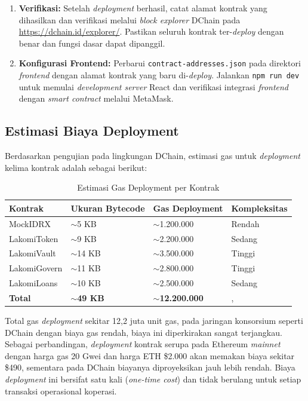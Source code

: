 \begin{enumerate}
	\item \textbf{Verifikasi:} Setelah \textit{deployment} berhasil, catat alamat kontrak yang dihasilkan dan verifikasi melalui \textit{block explorer} DChain pada \url{https://dchain.id/explorer/}. Pastikan seluruh kontrak ter-\textit{deploy} dengan benar dan fungsi dasar dapat dipanggil.
	\item \textbf{Konfigurasi Frontend:} Perbarui \texttt{contract-addresses.json} pada direktori \textit{frontend} dengan alamat kontrak yang baru di-\textit{deploy}. Jalankan \texttt{npm run dev} untuk memulai \textit{development server} React dan verifikasi integrasi \textit{frontend} dengan \textit{smart contract} melalui MetaMask.
\end{enumerate}

\subsection{Estimasi Biaya Deployment}

Berdasarkan pengujian pada lingkungan DChain, estimasi gas untuk \textit{deployment} kelima kontrak adalah sebagai berikut:

\begin{table}[H]
\centering
\caption{Estimasi Gas Deployment per Kontrak}
\label{tab:deploy-gas}
\footnotesize
\begin{tabular}{p{}p{}p{}p{}}
\toprule
\textbf{Kontrak} & \textbf{Ukuran Bytecode} & \textbf{Gas Deployment} & \textbf{Kompleksitas} \\
\midrule
MockIDRX & $\sim$5 KB & $\sim$1.200.000 & Rendah \\
LakomiToken & $\sim$9 KB & $\sim$2.200.000 & Sedang \\
LakomiVault & $\sim$14 KB & $\sim$3.500.000 & Tinggi \\
LakomiGovern & $\sim$11 KB & $\sim$2.800.000 & Tinggi \\
LakomiLoans & $\sim$10 KB & $\sim$2.500.000 & Sedang \\
\midrule
\textbf{Total} & \textbf{$\sim$49 KB} & \textbf{$\sim$12.200.000} & ,  \\
\bottomrule
\end{tabular}
\end{table}

Total gas \textit{deployment} sekitar 12,2 juta unit gas, pada jaringan konsorsium seperti DChain dengan biaya gas rendah, biaya ini diperkirakan sangat terjangkau. Sebagai perbandingan, \textit{deployment} kontrak serupa pada Ethereum \textit{mainnet} dengan harga gas 20 Gwei dan harga ETH \$2.000 akan memakan biaya sekitar \$490, sementara pada DChain biayanya diproyeksikan jauh lebih rendah. Biaya \textit{deployment} ini bersifat satu kali (\textit{one-time cost}) dan tidak berulang untuk setiap transaksi operasional koperasi.

